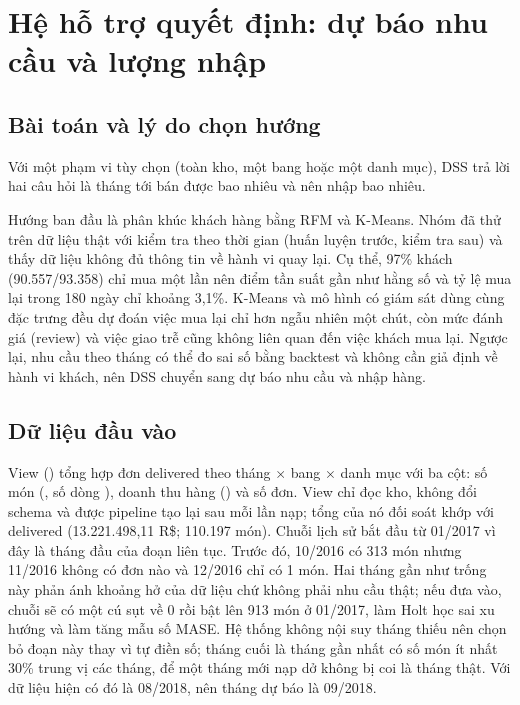 \section{Hệ hỗ trợ quyết định: dự báo nhu cầu và lượng nhập}\label{sec:dss}
\subsection{Bài toán và lý do chọn hướng}
Với một phạm vi tùy chọn (toàn kho, một bang hoặc một danh mục), DSS trả lời hai câu hỏi là tháng tới bán được bao nhiêu và nên nhập bao nhiêu.

Hướng ban đầu là phân khúc khách hàng bằng RFM và K-Means. Nhóm đã thử trên dữ liệu thật với kiểm tra theo thời gian (huấn luyện trước, kiểm tra sau) và thấy dữ liệu không đủ thông tin về hành vi quay lại. Cụ thể, 97\% khách (90.557/93.358) chỉ mua một lần nên điểm tần suất gần như hằng số và tỷ lệ mua lại trong 180 ngày chỉ khoảng 3,1\%. K-Means và mô hình có giám sát dùng cùng đặc trưng đều dự đoán việc mua lại chỉ hơn ngẫu nhiên một chút, còn mức đánh giá (review) và việc giao trễ cũng không liên quan đến việc khách mua lại. Ngược lại, nhu cầu theo tháng có thể đo sai số bằng backtest và không cần giả định về hành vi khách, nên DSS chuyển sang dự báo nhu cầu và nhập hàng.

\subsection{Dữ liệu đầu vào}\label{sec:dss-data}
View  () tổng hợp đơn delivered theo tháng $\times$ bang $\times$ danh mục với ba cột: số món (, số dòng ), doanh thu hàng () và số đơn. View chỉ đọc kho, không đổi schema và được pipeline tạo lại sau mỗi lần nạp; tổng của nó đối soát khớp với  delivered (13.221.498,11 R\$; 110.197 món). Chuỗi lịch sử bắt đầu từ 01/2017 vì đây là tháng đầu của đoạn liên tục. Trước đó, 10/2016 có 313 món nhưng 11/2016 không có đơn nào và 12/2016 chỉ có 1 món. Hai tháng gần như trống này phản ánh khoảng hở của dữ liệu chứ không phải nhu cầu thật; nếu đưa vào, chuỗi sẽ có một cú sụt về 0 rồi bật lên 913 món ở 01/2017, làm Holt học sai xu hướng và làm tăng mẫu số MASE. Hệ thống không nội suy tháng thiếu nên chọn bỏ đoạn này thay vì tự điền số; tháng cuối là tháng gần nhất có số món ít nhất 30\% trung vị các tháng, để một tháng mới nạp dở không bị coi là tháng thật. Với dữ liệu hiện có đó là 08/2018, nên tháng dự báo là 09/2018.

